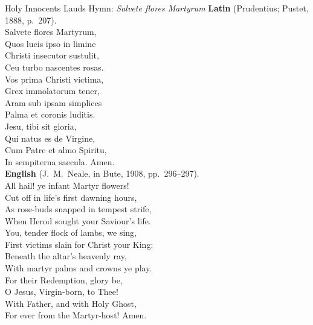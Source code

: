 \begin{massbox}{Holy Innocents Lauds Hymn: \textit{Salvete flores Martyrum}}
\textbf{Latin} (Prudentius; Pustet, 1888, p.~207).\\
Salvete flores Martyrum,\\
Quos lucis ipso in limine\\
Christi insecutor sustulit,\\
Ceu turbo nascentes rosas.\\[0.4em]
Vos prima Christi victima,\\
Grex immolatorum tener,\\
Aram sub ipsam simplices\\
Palma et coronis luditis.\\[0.4em]
Jesu, tibi sit gloria,\\
Qui natus es de Virgine,\\
Cum Patre et almo Spiritu,\\
In sempiterna saecula. Amen.\\[0.5em]
\textbf{English} (J.~M.~Neale, in Bute, 1908, pp.~296--297).\\
All hail! ye infant Martyr flowers!\\
Cut off in life's first dawning hours,\\
As rose-buds snapped in tempest strife,\\
When Herod sought your Saviour's life.\\[0.4em]
You, tender flock of lambs, we sing,\\
First victims slain for Christ your King:\\
Beneath the altar's heavenly ray,\\
With martyr palms and crowns ye play.\\[0.4em]
For their Redemption, glory be,\\
O Jesus, Virgin-born, to Thee!\\
With Father, and with Holy Ghost,\\
For ever from the Martyr-host! Amen.
\end{massbox}


